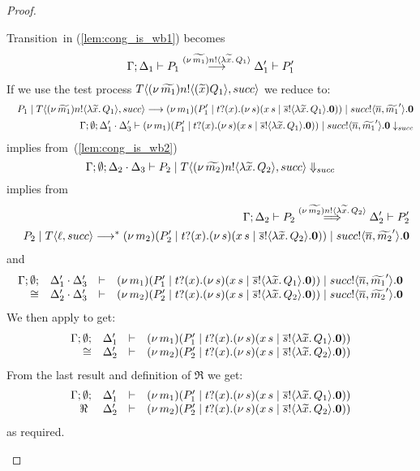 \begin{proof}
\begin{enumerate}
\begin{enumerate}[i.]
						\noi Transition~in (\ref{lem:cong_is_wb1}) becomes
						\begin{eqnarray}
							\Gamma; \Delta_1 \vdash P_1 \stackrel{(\nu\, \widetilde{m_1}) n ! \langle \lambda \widetilde{x}.\,Q_1 \rangle}{\longrightarrow} \Delta_1' \vdash P_1'
							\label{lem:cong_is_wb3}
						\end{eqnarray}
						\noi If we use the test process $T\langle (\nu\, \widetilde{m_1}) n ! \langle (\widetilde{x}) Q_1 \rangle, succ \rangle$ we reduce to:%
						\begin{eqnarray*}
							&& P_1 \;|\; T\langle (\nu\, \widetilde{m_1}) n ! \langle \lambda \widetilde{x}.\,Q_1 \rangle, succ \rangle
							\longrightarrow
							(\nu\, m_1)(P_1' \;|\; t ? (x) . (\nu\, s)(x\, {s} \;|\; \overline{s} ! \langle \lambda \widetilde{x}.\,Q_1 \rangle . \mathbf{0})) \;|\; succ ! \langle \overline{n}, \widetilde{m_1}' \rangle . \mathbf{0} \\
							&& \Gamma; \emptyset; \Delta_1' \cdot \Delta_3' \vdash (\nu\, m_1)(P_1' \;|\; t ? (x) . (\nu\, s)(x\, {s} \;|\; \overline{s} ! \langle \lambda \widetilde{x}.\,Q_1 \rangle . \mathbf{0})) \;|\; succ ! \langle \overline{n}, \widetilde{m_1}' \rangle . \mathbf{0} \downarrow_{succ}
						\end{eqnarray*}
						\noi implies from~(\ref{lem:cong_is_wb2})
						\[
							\Gamma; \emptyset; \Delta_2 \cdot \Delta_3 \vdash P_2 \;|\; T\langle (\nu\, \widetilde{m_2}) n ! \langle \lambda \widetilde{x}.\,Q_2 \rangle, succ \rangle \Downarrow_{succ}
						\]
						\noi implies from 
						\begin{eqnarray}
							&& \Gamma; \Delta_2 \vdash P_2 \stackrel{(\nu\, \widetilde{m_2}) n ! \langle \lambda \widetilde{x}.\,Q_2 \rangle}{\Longrightarrow} \Delta_2' \vdash P_2'
							\label{lem:cong_is_wb4}\\
							&& P_2 \;|\; T \langle \ell, succ \rangle \longrightarrow^{*} (\nu\, m_2)(P_2' \;|\; t ? (x) . (\nu\, s)(x\, {s} \;|\; \overline{s} ! \langle \lambda \widetilde{x}.\,Q_2 \rangle . \mathbf{0})) \;|\; succ ! \langle \overline{n}, \widetilde{m_2}' \rangle . \mathbf{0} \nonumber
						\end{eqnarray}
						\noi and
						\[
							\begin{array}{rcll} \Gamma; \emptyset; &\Delta_1' \cdot \Delta_3'& \vdash& (\nu\, m_1)(P_1' \;|\; t ? (x) . (\nu\, s)(x\, {s} \;|\; \overline{s} ! \langle \lambda \widetilde{x}.\,Q_1 \rangle . \mathbf{0})) \;|\; succ ! \langle \overline{n}, \widetilde{m_1}' \rangle . \mathbf{0}\\ \cong &\Delta_2' \cdot \Delta_3'& \vdash &  (\nu\, m_2)(P_2' \;|\; t ? (x) . (\nu\, s)(x\, {s} \;|\; \overline{s} ! \langle \lambda \widetilde{x}.\,Q_2 \rangle . \mathbf{0})) \;|\; succ ! \langle \overline{n}, \widetilde{m_2}' \rangle . \mathbf{0} \end{array}
						\]
						\noi We then apply  to get:
						\[
							\begin{array}{rcll} \Gamma; \emptyset; &\Delta_1'& \vdash& (\nu\, m_1)(P_1' \;|\; t ? (x) . (\nu\, s)(x\, {s} \;|\; \overline{s} ! \langle \lambda \widetilde{x}.\,Q_1 \rangle . \mathbf{0}))\\ \cong &\Delta_2'& \vdash &  (\nu\, m_2)(P_2' \;|\; t ? (x) . (\nu\, s)(x\, {s} \;|\; \overline{s} ! \langle \lambda \widetilde{x}.\,Q_2 \rangle . \mathbf{0})) \end{array}
						\]
						\noi From the last result and definition of $\Re$ we get:
						\[
							\begin{array}{rcll} \Gamma; \emptyset; &\Delta_1'& \vdash& (\nu\, m_1)(P_1' \;|\; t ? (x) . (\nu\, s)(x\, {s} \;|\; \overline{s} ! \langle \lambda \widetilde{x}.\,Q_1 \rangle . \mathbf{0}))\\ \ \Re\  &\Delta_2'& \vdash &  (\nu\, m_2)(P_2' \;|\; t ? (x) . (\nu\, s)(x\, {s} \;|\; \overline{s} ! \langle \lambda \widetilde{x}.\,Q_2 \rangle . \mathbf{0})) \end{array}
						\]
						\noi as required.


\end{enumerate}
\end{enumerate}
\end{proof}
